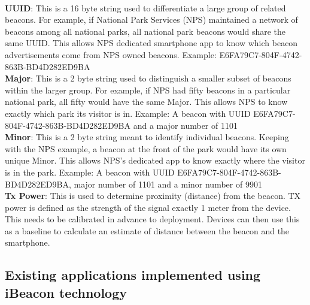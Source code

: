 \documentclass[12pt]{article}
\begin{document}
\paragraph{} 
\textbf{UUID}: This is a 16 byte string used to differentiate a large group of related beacons. For example, if National Park Services (NPS) maintained a network of beacons among all national parks, all national park beacons would share the same UUID. This allows NPS dedicated smartphone app to know which beacon advertisements come from NPS owned beacons. Example: E6FA79C7-804F-4742-863B-BD4D282ED9BA \\

\textbf{Major}: This is a 2 byte string used to distinguish a smaller subset of beacons within the larger group. For example, if NPS had fifty beacons in a particular national park, all fifty would have the same Major. This allows NPS to know exactly which park its visitor is in. Example: A beacon with UUID E6FA79C7-804F-4742-863B-BD4D282ED9BA and a major number of 1101  \\

\textbf{Minor}: This is a 2 byte string meant to identify individual beacons. Keeping with the NPS example, a beacon at the front of the park would have its own unique Minor. This allows NPS’s dedicated app to know exactly where the visitor is in the park. Example: A beacon with UUID E6FA79C7-804F-4742-863B-BD4D282ED9BA, major number of 1101 and a minor number of 9901\\

\textbf{Tx Power}: This is used to determine proximity (distance) from the beacon. TX power is defined as the strength of the signal exactly 1 meter from the device. This needs to be calibrated in advance to deployment. Devices can then use this as a baseline to calculate an estimate of distance between the beacon and the smartphone.  \\

\subsection{Existing applications implemented using iBeacon technology}
\end{document}
